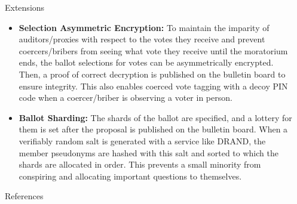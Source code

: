 \documentclass[final]{beamer}
\newlength{\sepwidth}
\newlength{\colwidth}
\newcommand{\separatorcolumn}{\begin{column}{\sepwidth}\end{column}}
\begin{document}
\begin{frame}[t]
\begin{columns}[t]
\begin{column}{\colwidth}
\begin{block}{Extensions}
\begin{itemize}
  To ensure authenticity, each pseudonym receives only one unique signature. The client device maintains a consistent, secretly and randomly generated blinding factor for all votes. As an added benefit, a bulletin board can detect private key leaks, and an invalid returned signature alerts the voter to a private key breach, promoting accountability by discouraging the use of leak-prone devices or practices.

\item \textbf{Selection Asymmetric Encryption:} To maintain the imparity of auditors/proxies with respect to the votes they receive and prevent coercers/bribers from seeing what vote they receive until the moratorium ends, the ballot selections for votes can be asymmetrically encrypted. Then, a proof of correct decryption is published on the bulletin board to ensure integrity. This also enables coerced vote tagging with a decoy PIN code when a coercer/briber is observing a voter in person. 

\item \textbf{Ballot Sharding:} The shards of the ballot are specified, and a lottery for them is set after the proposal is published on the bulletin board. When a verifiably random salt is generated with a service like DRAND, the member pseudonyms are hashed with this salt and sorted to which the shards are allocated in order. This prevents a small minority from conspiring and allocating important questions to themselves. 
    \end{itemize}

  \end{block}
  

  \begin{block}{References}

    \nocite{*}
    \footnotesize{}

  \end{block}

\end{column}

\separatorcolumn
\end{columns}
\end{frame}
\end{document}
